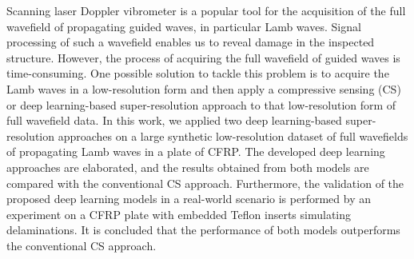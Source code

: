 Scanning laser Doppler vibrometer is a popular tool for the acquisition of the full wavefield of propagating guided waves, in particular Lamb waves. Signal processing of such a wavefield enables us to reveal damage in the inspected structure.
However, the process of acquiring the full wavefield of guided waves is time-consuming.
One possible solution to tackle this problem is to acquire the Lamb waves in a low-resolution form and then apply a compressive sensing (CS) or deep learning-based super-resolution approach to that low-resolution form of full wavefield data. 
In this work, we applied two deep learning-based super-resolution approaches on a large synthetic low-resolution dataset of full wavefields of propagating Lamb waves in a plate of CFRP. 
The developed deep learning approaches are elaborated, and the results obtained from both models are compared with the conventional CS approach. 
Furthermore, the validation of the proposed deep learning models in a real-world scenario is performed by an experiment on a CFRP plate with embedded Teflon inserts simulating delaminations. 
It is concluded that the performance of both models outperforms the conventional CS approach.